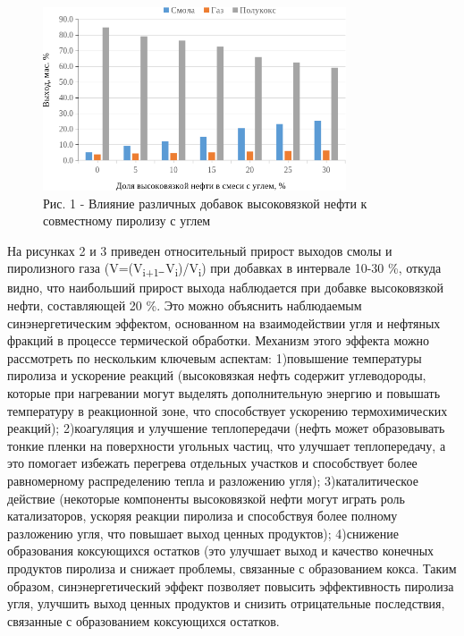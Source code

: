 \begin{figure}[H]
	\centering
	\includegraphics[width=0.8\textwidth]{media/chem/image113}
	\caption*{Рис. 1 - Влияние различных добавок высоковязкой нефти к
совместному пиролизу с углем}
\end{figure}

\begin{multicols}{2}
На рисунках 2 и 3 приведен относительный прирост выходов смолы и
пиролизного газа (V=(V\textsubscript{i+1 ̶}
V\textsubscript{i})/V\textsubscript{i}) при добавках в интервале 10-30
\%, откуда видно, что наибольший прирост выхода наблюдается при добавке
высоковязкой нефти, составляющей 20 \%. Это можно объяснить наблюдаемым
синэнергетическим эффектом, основанном на взаимодействии угля и нефтяных
фракций в процессе термической обработки. Механизм этого эффекта можно
рассмотреть по нескольким ключевым аспектам: 1)повышение температуры
пиролиза и ускорение реакций (высоковязкая нефть содержит углеводороды,
которые при нагревании могут выделять дополнительную энергию и повышать
температуру в реакционной зоне, что способствует ускорению
термохимических реакций); 2)коагуляция и улучшение теплопередачи (нефть
может образовывать тонкие пленки на поверхности угольных частиц, что
улучшает теплопередачу, а это помогает избежать перегрева отдельных
участков и способствует более равномерному распределению тепла и
разложению угля); 3)каталитическое действие (некоторые компоненты
высоковязкой нефти могут играть роль катализаторов, ускоряя реакции
пиролиза и способствуя более полному разложению угля, что повышает выход
ценных продуктов); 4)снижение образования коксующихся остатков (это
улучшает выход и качество конечных продуктов пиролиза и снижает
проблемы, связанные с образованием кокса. Таким образом,
синэнергетический эффект позволяет повысить эффективность пиролиза угля,
улучшить выход ценных продуктов и снизить отрицательные последствия,
связанные с образованием коксующихся остатков.
\end{multicols}


